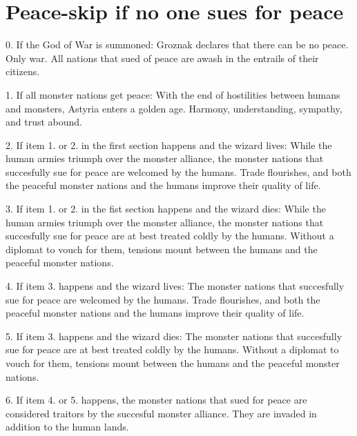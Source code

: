 \documentclass[green]{guildcamp2}
\begin{document}
\section {Peace-skip if no one sues for peace}
		\begin{enum}
		\item 0. If the God of War is summoned: Groznak declares that there can be no peace. Only war. All nations that sued of peace are awash in the entrails of their citizens.
		\item 1. If all monster nations get peace: With the end of hostilities between humans and monsters, Astyria enters a golden age. Harmony, understanding, sympathy, and trust abound. 
		\item 2. If item 1. or 2. in the first section happens and the wizard lives: While the human armies triumph over the monster alliance, the monster nations that succesfully sue for peace are welcomed by the humans. Trade flourishes, and both the peaceful monster nations and the humans improve their quality of life.
		\item 3. If item 1. or 2. in the fist section happens and the wizard dies: While the human armies triumph over the monster alliance, the monster nations that succesfully sue for peace are at best treated coldly by the humans. Without a diplomat to vouch for them, tensions mount between the humans and the peaceful monster nations.
		\item 4. If item 3. happens and the wizard lives: The monster nations that succesfully sue for peace are welcomed by the humans. Trade flourishes, and both the peaceful monster nations and the humans improve their quality of life.
		\item 5. If item 3. happens and the wizard dies: The monster nations that succesfully sue for peace are at best treated coldly by the humans. Without a diplomat to vouch for them, tensions mount between the humans and the peaceful monster nations.
		\item 6. If item 4. or 5. happens, the monster nations that sued for peace are considered traitors by the succesful monster alliance. They are invaded in addition to the human lands.
		\end{enum}
\end{document}
